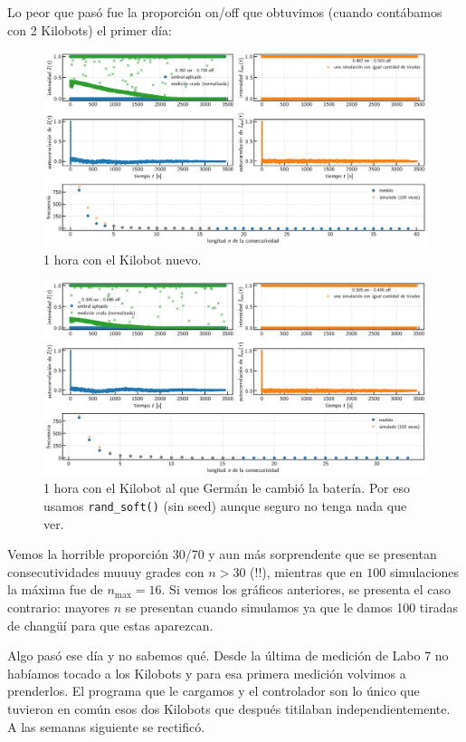 \documentclass[a4paper]{article}
\begin{document}
Lo peor que pasó fue la proporción on/off que obtuvimos (cuando contábamos con 2 Kilobots) el primer día:

\begin{figure}[!h]
	\centering
	\includegraphics[width=\linewidth]{Resultados/1h_soft.png}
	\caption{1 hora con el Kilobot nuevo.}
	\label{fig:1hora_soft}
\end{figure}

\begin{figure}[!h]
	\centering
	\includegraphics[width=\linewidth]{Resultados/1h_hard.png}
	\caption{1 hora con el Kilobot al que Germán le cambió la batería. Por eso usamos \texttt{rand\_soft()} (sin seed) aunque seguro no tenga nada que ver.}
	\label{fig:1hora_hard}
\end{figure}

Vemos la horrible proporción 30/70 y aun más sorprendente que se presentan consecutividades muuuy grades con $n>30$ (!!), mientras que en $100$ simulaciones la máxima fue de $n_\mathrm{max} = 16$. Si vemos los gráficos anteriores, se presenta el caso contrario: mayores $n$ se presentan cuando simulamos ya que le damos 100 tiradas de changüí para que estas aparezcan.

Algo pasó ese día y no sabemos qué. Desde la última de medición de Labo 7 no habíamos tocado a los Kilobots y para esa primera medición volvimos a prenderlos. El programa que le cargamos y el controlador son lo único que tuvieron en común esos dos Kilobots que después titilaban independientemente. A las semanas siguiente se rectificó.
\end{document}
